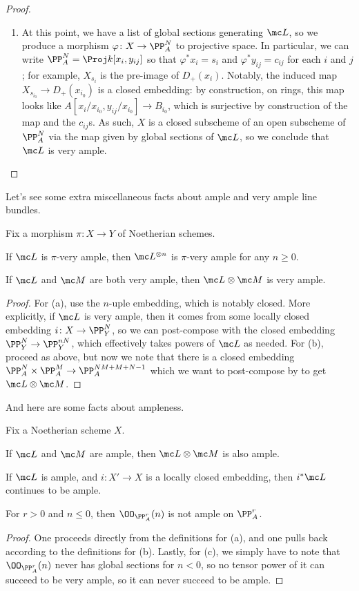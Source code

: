 \documentclass[../notes.tex]{subfiles}
\begin{document}
\begin{proof}
\begin{enumerate}
		\item At this point, we have a list of global sections generating $\mc L$, so we produce a morphism $\varphi\colon X\to\PP^N_A$ to projective space. In particular, we can write $\PP^N_A=\Proj k[x_i,y_{ij}]$ so that $\varphi^*x_i=s_i$ and $\varphi^*y_{ij}=c_{ij}$ for each $i$ and $j$; for example, $X_{s_i}$ is the pre-image of $D_+(x_i)$. Notably, the induced map $X_{s_{i_0}}\to D_+(x_{i_0})$ is a closed embedding: by construction, on rings, this map looks like $A[x_i/x_{i_0},y_{ij}/x_{i_0}]\to B_{i_0}$, which is surjective by construction of the map and the $c_{ij}$s. As such, $X$ is a closed subscheme of an open subscheme of $\PP^N_A$ via the map given by global sections of $\mc L$, so we conclude that $\mc L$ is very ample.
		\qedhere
	\end{enumerate}
\end{proof}
Let's see some extra miscellaneous facts about ample and very ample line bundles.
\begin{lemma}
	Fix a morphism $\pi\colon X\to Y$ of Noetherian schemes.
	\begin{listalph}
		\item If $\mc L$ is $\pi$-very ample, then $\mc L^{\otimes n}$ is $\pi$-very ample for any $n\ge0$.
		\item If $\mc L$ and $\mc M$ are both very ample, then $\mc L\otimes\mc M$ is very ample. 
	\end{listalph}
\end{lemma}
\begin{proof}
	For (a), use the $n$-uple embedding, which is notably closed. More explicitly, if $\mc L$ is very ample, then it comes from some locally closed embedding $i\colon X\to\PP^N_Y$, so we can post-compose with the closed embedding $\PP^N_Y\to\PP^{nN}_Y$, which effectively takes powers of $\mc L$ as needed. For (b), proceed as above, but now we note that there is a closed embedding $\PP^N_A\times\PP^M_A\to\PP^{NM+M+N-1}_A$ which we want to post-compose by to get $\mc L\otimes\mc M$.
\end{proof}
And here are some facts about ampleness.
\begin{lemma}
	Fix a Noetherian scheme $X$.
	\begin{listalph}
		\item If $\mc L$ and $\mc M$ are ample, then $\mc L\otimes\mc M$ is also ample.
		\item If $\mc L$ is ample, and $i\colon X'\to X$ is a locally closed embedding, then $i^*\mc L$ continues to be ample.
		\item For $r>0$ and $n\le0$, then $\OO_{\PP^r_A}(n)$ is not ample on $\PP^r_A$.
	\end{listalph}
\end{lemma}
\begin{proof}
	One proceeds directly from the definitions for (a), and one pulls back according to the definitions for (b). Lastly, for (c), we simply have to note that $\OO_{\PP^r_A}(n)$ never has global sections for $n<0$, so no tensor power of it can succeed to be very ample, so it can never succeed to be ample.
\end{proof}
\end{document}
